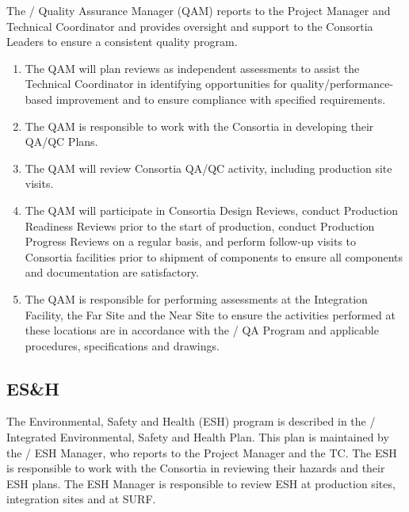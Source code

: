The / Quality Assurance Manager (QAM) reports
to the  Project Manager and  Technical
Coordinator and provides oversight and support to the Consortia
Leaders to ensure a consistent quality program.
\begin{enumerate}
  \item The QAM will plan reviews as independent assessments to assist
    the  Technical Coordinator in identifying opportunities for
    quality/performance-based improvement and to ensure compliance
    with specified requirements.
  \item The QAM is responsible to work with the Consortia in
    developing their QA/QC Plans.
  \item The QAM will review Consortia QA/QC activity, including
    production site visits.
  \item The QAM will participate in Consortia Design Reviews, conduct
    Production Readiness Reviews prior to the start of production,
    conduct Production Progress Reviews on a regular basis, and
    perform follow-up visits to Consortia facilities prior to shipment
    of components to ensure all components and documentation are
    satisfactory.
\item The QAM is responsible for performing assessments at the
  Integration Facility, the Far Site and the Near Site to
  ensure the activities performed at these locations are in accordance
  with the / QA Program and applicable procedures,
  specifications and drawings.
\end{enumerate}

\subsection{ES\&H}
\label{sec:fdsp-coord-esh}

The  Environmental, Safety and Health (ESH) program is described
in the / Integrated Environmental, Safety and Health
Plan. This plan is maintained by the / ESH Manager, who
reports to the  Project Manager and the TC. The ESH is responsible
to work with the Consortia in reviewing their hazards and their ESH
plans.  The ESH Manager is responsible to review ESH at production
sites, integration sites and at SURF.
